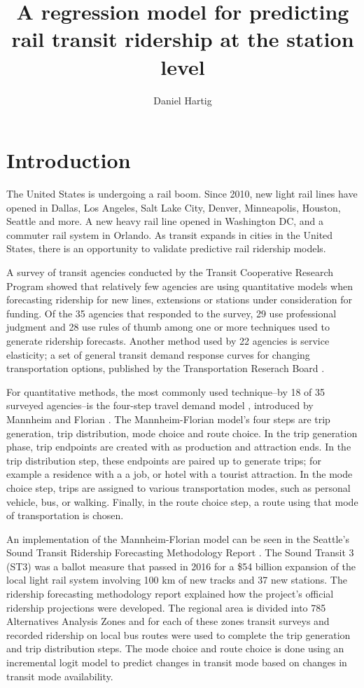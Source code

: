 \documentclass[11pt]{article}
\title{A regression model for predicting rail transit ridership at the station level}
\author{Daniel Hartig}
\date{\vspace{-5ex}}
\begin{document}
\maketitle

\section{Introduction}

The United States is undergoing a rail boom. Since 2010, new light rail lines have opened in Dallas, Los Angeles, Salt Lake City, Denver, Minneapolis, Houston, Seattle and more.  A new heavy rail line opened in Washington DC, and a commuter rail system in Orlando. As transit expands in cities in the United States, there is an opportunity to validate predictive rail ridership models. 

A survey of transit agencies \cite{Boyle2006} conducted by the Transit Cooperative Research Program showed that relatively few agencies are using quantitative models when forecasting ridership for new lines, extensions or stations under consideration for funding. Of the 35 agencies that responded to the survey, 29 use professional judgment and 28 use rules of thumb among one or more techniques used to generate ridership forecasts. Another method used by 22 agencies is service elasticity; a set of general transit demand response curves for changing transportation options, published by the Transportation Reserach Board \cite{tcrp95}. 

For quantitative methods, the most commonly used technique--by 18 of 35 surveyed agencies--is the four-step travel demand model \cite{McNally2008}, introduced by Mannheim and Florian \cite{Mannheim1979, Florian1988}. The Mannheim-Florian model's four steps are trip generation, trip distribution, mode choice and route choice. In the trip generation phase, trip endpoints are created with as production and attraction ends. In the trip distribution step, these endpoints are paired up to generate trips; for example a residence with a a job, or hotel with a tourist attraction. In the mode choice step, trips are assigned to various transportation modes, such as personal vehicle, bus, or walking. Finally, in the route choice step, a route using that mode of transportation is chosen.

An implementation of the Mannheim-Florian model can be seen in the Seattle's Sound Transit Ridership Forecasting Methodology Report \cite{ST3_2015, ST3_add}. The Sound Transit 3 (ST3) was a ballot measure that passed in 2016 for a \$54 billion expansion of the local light rail system involving 100 km of new tracks and 37 new stations. The ridership forecasting methodology report explained how the project's official ridership projections were developed. The regional area is divided into 785 Alternatives Analysis Zones and for each of these zones transit surveys and recorded ridership on local bus routes were used to complete the trip generation and trip distribution steps. The mode choice and route choice is done using an incremental logit model to predict changes in transit mode based on changes in transit mode availability.
\end{document}
